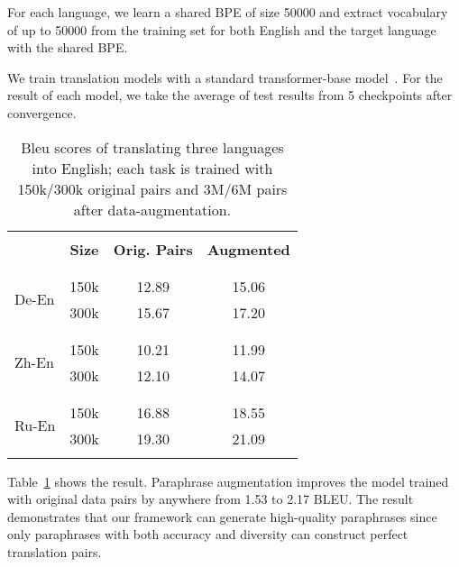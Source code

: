 For each language, we learn a shared BPE of size 50000 
and extract vocabulary of up to 
50000 from the training set for both English and the target language 
with the shared BPE. 

We train translation models with a standard 
transformer-base model~\citep{vaswani2017attention}. 
For the result of each model, we take the average of test results 
from 5 checkpoints after convergence.

\begin{table}
\centering
\small
\begin{tabular}{p{1cm}ccc}
\hline
\\ [-1.8ex]
& \textbf{Size} & \textbf{Orig. Pairs} & \textbf{Augmented} \\
\\ [-1.8ex]
\cline{2-4} 
\\ [-1.8ex]
\multirow{2}{1cm}{De-En} & 150k & 12.89 & 15.06 \\
& 300k & 15.67 & 17.20 \\
\\ [-1.8ex]
\hline
\\ [-1.8ex]
\multirow{2}{1cm}{Zh-En} & 150k & 10.21 & 11.99 \\
& 300k & 12.10 & 14.07 \\
\\ [-1.8ex]
\hline
\\ [-1.8ex]
\multirow{2}{1cm}{Ru-En} & 150k & 16.88 & 18.55 \\
& 300k & 19.30 & 21.09 \\
\\ [-1.8ex]
\hline
\end{tabular}
\caption{\label{tab:augment}
Bleu scores of translating three languages into English; 
each task is trained with 150k/300k original pairs 
and 3M/6M pairs after data-augmentation.}
\end{table}

Table~\ref{tab:augment} shows the result. 
Paraphrase augmentation improves the model trained with original data pairs 
by anywhere from 1.53 to 2.17 BLEU. The result demonstrates 
that our framework can generate high-quality paraphrases since only paraphrases with both accuracy and diversity can construct perfect translation pairs.
